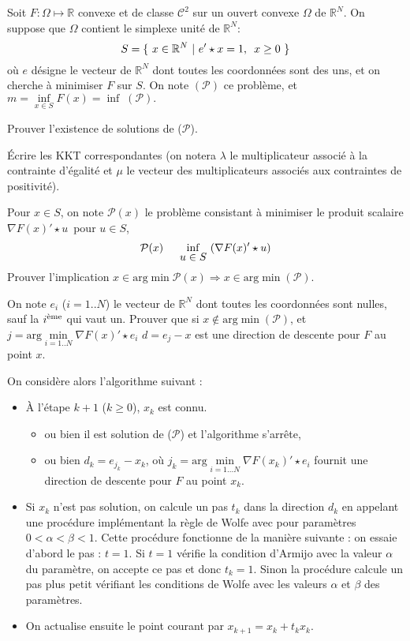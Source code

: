 \documentclass[12pt,a4paper,fleqn]{report}
\newcommand{\R}{\mathbb R}
\newcommand{\grad}{\nabla}
\renewcommand{\P}{\mathcal P}
\newcommand{\push}[1]{\rule{0pt}{0pt}\hspace{#1pt}}
\begin{document}
\begin{exercice}\label{exo}
Soit $F:\Omega\mapsto \R$ convexe et de classe $\mathcal C^2$ sur un ouvert convexe $\Omega$ de $\R^N$. On suppose que $\Omega$ contient le simplexe unit\'e de $\R^N$:
\[
S=\{\ x\in\R^N\ | \ e'\star x=1,\push{5} x\geq 0 \ \}
\]
o\`u $e$ d\'esigne le vecteur de $\R^N$ dont toutes les coordonn\'ees sont des \og uns\fg, et on cherche \`a minimiser $F$ sur $S$. On note $(\P)$ ce probl\`eme, et 
$
m=\underset{x\in S}{\inf} F(x)= \inf\;(\P).
$
\begin{questions}
\item Prouver l'existence de solutions de ($\P$).
\item \'Ecrire les KKT correspondantes (on notera $\lambda$ le multiplicateur associ\'e \`a la contrainte d'\'egalit\'e et $\mu$ le vecteur des multiplicateurs associ\'es aux contraintes de positivit\'e).
\item Pour $x\in S$, on note $\P(x)$ le probl\`eme consistant \`a minimiser le produit scalaire $\grad F(x)'\star u $\, pour $u\in S$,
\[
\P(x)\push{15} \underset{\mbox{$u\in S$}}{\inf} \ (\grad F(x)'\star u)
\]
Prouver l'implication $x\in \mbox{arg} \min \P(x) \Rightarrow x\in \mbox{arg} \min (\P)$.
\item On note $e_i$ ($i=1..N$) le vecteur de $\R^N$ dont toutes les coordonn\'ees sont nulles, sauf la $i^{\mbox{\scriptsize \`eme}}$ qui vaut un. Prouver que si $x\not\in \mbox{arg} \min (\P)$, et $j=\mbox{arg} \underset{i=1..N}{\min} \grad F(x)'\star e_i$ $d=e_j-x$ est une direction de descente pour $F$ au point $x$. 
\item On consid\`ere alors l'algorithme suivant :
\begin{itemize}
\item \`A l'\'etape $k+1$ ($k\geq 0$), $x_k$ est connu.
\begin{itemize}
\item ou bien il est solution de ($\P$) et l'algorithme s'arr\^ete,
\item ou bien $d_k=e_{j_k}-x_k$, o\`u $j_k=\mbox{arg} \underset{i=1\dots N}{\min} \grad F(x_k)'\star e_i$ fournit une direction de descente pour $F$ au point $x_k$.
\end{itemize}
\item Si $x_k$ n'est pas solution, on calcule un pas $t_k$ dans la direction $d_k$ en appelant une proc\'edure impl\'ementant la r\`egle de Wolfe avec pour param\`etres \mbox{$0<\alpha<\beta<1$}. Cette proc\'edure fonctionne de la mani\`ere suivante : on essaie d'abord le pas : $t=1$. Si $t=1$ v\'erifie la condition d'Armijo avec la valeur $\alpha$ du param\`etre, on accepte ce pas et donc $t_k=1$. Sinon la proc\'edure calcule un pas plus petit v\'erifiant les conditions de Wolfe avec les valeurs $\alpha$ et $\beta$ des param\`etres.
\item On actualise ensuite le point courant par $x_{k+1}=x_k +t_k x_k$.
\end{itemize}
\medskip


\end{questions}
\end{exercice}
\end{document}
